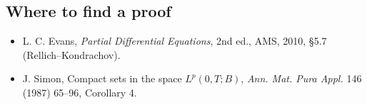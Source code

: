 \subsection*{Where to find a proof}

\begin{itemize}
\item L. C. Evans, \emph{Partial Differential Equations}, 2nd ed., AMS, 2010, §5.7 (Rellich--Kondrachov).
\item J. Simon, Compact sets in the space $L^p(0,T;B)$, \emph{Ann. Mat. Pura Appl.} 146 (1987) 65--96, Corollary 4.
\end{itemize}

